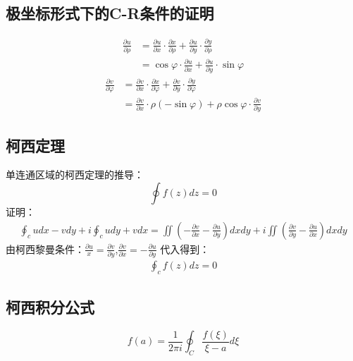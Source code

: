 \documentclass[UTF8]{article}
\begin{document}
\subsection{极坐标形式下的C-R条件的证明}
\begin{equation*}
	\begin{split}
		\frac{\partial u}{\partial \rho}&=\frac{\partial u}{\partial x}\cdot \frac{\partial x}{\partial \rho}+\frac{\partial u}{\partial y}\cdot\frac{\partial y}{\partial \rho}\\&=\cos \varphi \cdot\frac{\partial u}{\partial x}+\frac{\partial u}{\partial y}\cdot \sin \varphi
	\end{split}
\end{equation*}
\begin{equation*}
	\begin{split}
		\frac{\partial v}{\partial \varphi}&=\frac{\partial v}{\partial x}\cdot\frac{\partial x}{\partial \varphi}+ \frac{\partial v}{\partial y}\cdot \frac{\partial y}{\partial\varphi}\\&=\frac{\partial v}{\partial x}\cdot\rho(-\sin \varphi)+\rho\cos \varphi\cdot\frac{\partial v}{\partial y}
	\end{split}
\end{equation*}

\subsection{柯西定理}
单连通区域的柯西定理的推导：
$$
	\oint f(z)dz=0
$$
证明：
\begin{align*}
	\oint_c udx-vdy+i\oint_cudy+vdx=\iint(-\frac{\partial v}{\partial x}-\frac{\partial u}{\partial y})dxdy+i\iint(\frac{\partial v}{\partial y}-\frac{\partial u}{\partial x})dxdy
\end{align*}
由柯西黎曼条件：$\frac{\partial u}{x}=\frac{\partial v}{\partial y}$,$\frac{\partial v}{\partial x}=-\frac{\partial u}{\partial y}$
代入得到：
\begin{align*}
	\oint_cf(z)dz=0
\end{align*}
\subsection{柯西积分公式}
$$
	f(a)=\frac{1}{2\pi i}\oint_{C}\frac{f(\xi)}{\xi-a}d\xi
$$
\end{document}
